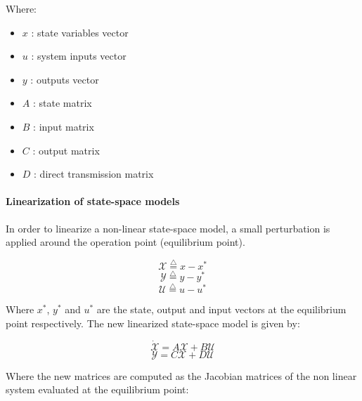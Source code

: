 Where:

\begin{itemize}
  \item $x$ : state variables vector
  \item $u$ : system inputs vector
  \item $y$ : outputs vector
  \item $A$ : state matrix
  \item $B$ : input matrix
  \item $C$ : output matrix
  \item $D$ : direct transmission matrix
\end{itemize}

\paragraph{Linearization of state-space models}


In order to linearize a non-linear state-space model, a small perturbation is applied around the operation point (equilibrium point).

\begin{equation}
   \mathcal{X} \overset{\triangle}{=} x-x^*
\end{equation}
\begin{equation}
   \mathcal{Y} \overset{\triangle}{=} y-y^*
\end{equation}
\begin{equation}
   \mathcal{U} \overset{\triangle}{=} u-u^*
\end{equation}

Where $x^*$, $y^*$ and $u^*$ are the state, output and input vectors at the equilibrium point respectively. The new linearized state-space model is given by:

\vspace{2cm}

\begin{equation}
 \dot{\mathcal{X}} = A \mathcal{X} + B \mathcal{U}
\end{equation}
\begin{equation}
\mathcal{Y} = C \mathcal{X} + D \mathcal{U}
\end{equation}

Where the new matrices are computed as the Jacobian matrices of the non linear system evaluated at the equilibrium point:

